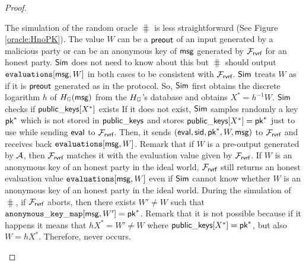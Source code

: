 \begin{proof}
\begin{itemize}
		
		The simulation of the random oracle $ \hash $ is less straightforward (See Figure \ref{oracle:HnoPK}).
		The value $ W $ can be a $ {\mathsf{preout}} $ of an input generated by a malicious party or can be an anonymous key of  $ \mathsf{msg} $ generated by $ \mathcal{F}_{\textsf{rvrf}} $ for an honest party. $ \mathsf{Sim} $ does not need to know about this but $ \hash $ should output $ \texttt{evaluations}[\mathsf{msg},W] $ in both cases to be consistent with $ \mathcal{F}_{\textsf{rvrf}} $.	 
		$ \mathsf{Sim} $ treats $ W $ as if it is $ {\mathsf{preout}} $ generated as in the protocol. So, $ \mathsf{Sim} $ first obtains the discrete logarithm $ h $ of $ H_{\mathbb{G}}(\mathsf{msg}) $ from the $ H_{\mathbb{G}} $'s database and obtains $ X^* = h^{-1}W $.    
		$ \mathsf{Sim} $ checks if $ {\mathsf{public\_keys}}[X^*] $ exists If it does not exist, $ \mathsf{Sim} $ samples randomly a key $ \mathsf{pk}^* $ which is not stored in $ {\mathsf{public\_keys}} $ and stores $ {\mathsf{public\_keys}}[X^*] = \mathsf{pk}^* $ just to use while sending $ \mathsf{eval} $ to $ \mathcal{F}_{\textsf{rvrf}} $. Then, it sends  $ (\mathsf{eval}, \textsf{sid},\mathsf{pk}^*,W,\mathsf{msg}) $ to $ \mathcal{F}_{\textsf{rvrf}} $ and receives back $ \texttt{evaluations}[\mathsf{msg},W] $.
		Remark that if $ W $ is a pre-output generated by $ \mathcal{A} $, then $ \mathcal{F}_{\textsf{rvrf}} $ matches it with the evaluation value given by $ \mathcal{F}_{\textsf{rvrf}} $. If $ W $ is an anonymous key of an honest party in the ideal world, $ \mathcal{F}_{\textsf{rvrf}} $ still returns an honest evaluation value $ \texttt{evaluations}[\mathsf{msg},W] $ even if $ \mathsf{Sim} $ cannot know whether $ W $ is an anonymous key of an honest party in the ideal world. 
		During the simulation of $ \hash $, if $ \mathcal{F}_{\textsf{rvrf}} $ aborts, then there exists $ W' \neq W $ such that $ \mathtt{anonymous\_key\_map}[\mathsf{msg},W'] = \mathsf{pk}^* $. Remark that it is not possible because if it happens it means that $ hX^* = W' \neq W  $ where $ {\mathsf{public\_keys}}[X^*] = \mathsf{pk}^* $, but also $ W = hX^* $. 
		Therefore,  never occurs.
		
		


\end{itemize}
\end{proof}
